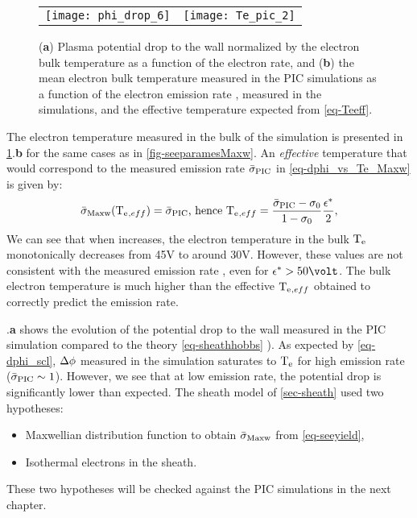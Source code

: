   \begin{figure}[hbt]
    \centering
    \begin{tabular}{@{} cc}
      \texttt{[image: phi\_drop\_6]}
      &
      \texttt{[image: Te\_pic\_2]}
    \end{tabular}
    \caption{({\bf a}) Plasma potential drop to the wall normalized by the electron bulk temperature as a function of the electron rate, and ({\bf b}) the mean electron bulk temperature measured in the \acs{PIC} simulations as a function of the electron emission rate \rate, measured in the simulations, and the effective temperature expected from \cref{eq-Teeff}.  }
    \label{fig-Tevsproba}
  \end{figure}
  
  The electron temperature measured in the bulk of the simulation is presented in \cref{fig-Tevsproba}.{\bf b} for the same cases as in \cref{fig-seeparamesMaxw}.
  An \emph{effective} temperature that would correspond to the measured emission rate $ \bar{\sigma }_{\rm PIC}$ in \cref{eq-dphi_vs_Te_Maxw} is given by:
  \begin{equation} \label{eq-Teeff}
      \bar{\sigma }_{\rm Maxw}(\mathrm{T_e}{}_{, eff}) =  \bar{\sigma }_{\rm PIC} \text{, hence } \mathrm{T_e}{}_{, eff} = \frac{ \bar{\sigma }_{\rm PIC} - \sigma_0}{1 - \sigma_0} \frac{\epsilon^{*}}{2},
  \end{equation}
  We can see that when \rate increases, the electron temperature in the bulk $\mathrm{T_e}$ monotonically decreases from 45V to around 30V.
  However, these values are not consistent with the measured emission rate \ratepic, even for $\crover > 50\volt$.
  The bulk electron temperature is much higher than the effective $\mathrm{T_e}{}_{, eff}$ obtained to correctly predict the emission rate.

  .{\bf a} shows the evolution of the potential drop to the wall measured in the \ac{PIC} simulation compared to the theory  \cref{eq-sheathhobbs} ).
  As expected by \cref{eq-dphi_scl}, $\Delta \phi$ measured in the simulation saturates to $\mathrm{T_e}$ for high emission rate ($ \bar{\sigma }_{\rm PIC} \sim 1$).
  However, we see that at low emission rate, the potential drop is significantly lower than expected.
  The sheath model of \cref{sec-sheath} used two hypotheses\string:
  \begin{itemize}
    \item Maxwellian distribution function to obtain $ \bar{\sigma }_{\rm Maxw}$ from \cref{eq-seeyield},
    \item Isothermal electrons in the sheath.
  \end{itemize}
  These two hypotheses will be checked against the PIC simulations in the next chapter.
